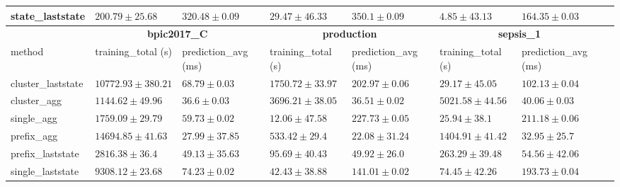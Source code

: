 \documentclass[twoside,11pt]{Latex/Classes/PhDthesisPSnPDF}
\begin{document}
\begin{table}[h]
{\begin{tabular}{llllllll}
			state\_laststate & $200.79 \pm 25.68$ & $320.48 \pm 0.09$ & $29.47 \pm 46.33$ & $350.1 \pm 0.09$ & $4.85 \pm 43.13$ & $164.35 \pm 0.03$ \\ 
			\bottomrule
			\toprule
			& \multicolumn{2}{c}{{\bfseries bpic2017\_C}} & \multicolumn{2}{c}{{\bfseries production}} & \multicolumn{2}{c}{{\bfseries sepsis\_1}} \\ \cmidrule(lr){2-3} \cmidrule(lr){4-5} \cmidrule(lr){6-7}
			method  & training\_total (s) & prediction\_avg (ms) & training\_total (s) & prediction\_avg (ms) & training\_total (s) & prediction\_avg (ms) \\ \midrule
			cluster\_laststate & $10772.93 \pm 380.21$ & $68.79 \pm 0.03$ & $1750.72 \pm 33.97$ & $202.97 \pm 0.06$ & $29.17 \pm 45.05$ & $102.13 \pm 0.04$ \\ 
			cluster\_agg & $1144.62 \pm 49.96$ & $36.6 \pm 0.03$ & $3696.21 \pm 38.05$ & $36.51 \pm 0.02$ & $5021.58 \pm 44.56$ & $40.06 \pm 0.03$ \\ 
			single\_agg & $1759.09 \pm 29.79$ & $59.73 \pm 0.02$ & $\mathbf{12.06 \pm 47.58}$ & $227.73 \pm 0.05$ & $25.94 \pm 38.1$ & $211.18 \pm 0.06$ \\ 
			prefix\_agg & $14694.85 \pm 41.63$ & $27.99 \pm 37.85$ & $533.42 \pm 29.4$ & $\mathbf{22.08 \pm 31.24}$ & $1404.91 \pm 41.42$ & $\mathbf{32.95 \pm 25.7}$ \\ 
			prefix\_laststate & $2816.38 \pm 36.4$ & $49.13 \pm 35.63$ & $95.69 \pm 40.43$ & $49.92 \pm 26.0$ & $263.29 \pm 39.48$ & $54.56 \pm 42.06$ \\ 
			single\_laststate & $9308.12 \pm 23.68$ & $74.23 \pm 0.02$ & $42.43 \pm 38.88$ & $141.01 \pm 0.02$ & $74.45 \pm 42.26$ & $193.73 \pm 0.04$ \\ 
			

\end{tabular}}
\end{table}
\end{document}
